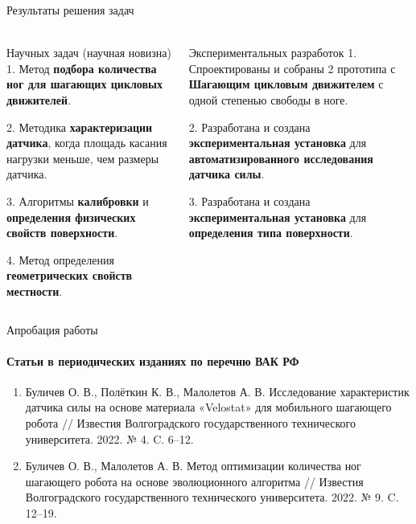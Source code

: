 \documentclass[aspectratio=169,xcolor=table]{beamer}
\begin{document}
\begin{frame}[t]{Результаты решения задач}
    \framesubtitle{}
    \vspace{-0.7cm}
    \begin{columns}[T,onlytextwidth]
        \begin{column}{0.48\textwidth}
            \begin{block}{Научных задач (научная новизна)}
                1. Метод \textbf{подбора количества ног для шагающих цикловых движителей}.

                2. Методика \textbf{характеризации датчика}, когда площадь касания нагрузки меньше, чем размеры датчика.

                3. Алгоритмы \textbf{калибровки} и \textbf{определения физических свойств поверхности}.

                4. Метод определения \textbf{геометрических свойств местности}.

            \end{block}
        \end{column}
        \begin{column}{0.48\textwidth}
            \begin{alertblock}{Экспериментальных разработок}
                1. Спроектированы и собраны 2 прототипа с \textbf{Шагающим цикловым движителем} с одной степенью свободы в ноге.

                2. Разработана и создана \textbf{экспериментальная установка} для \textbf{автоматизированного исследования датчика силы}.

                3. Разработана и создана \textbf{экспериментальная установка} для \textbf{определения типа поверхности}.

            \end{alertblock}
        \end{column}
    \end{columns}
\end{frame}

\begin{frame}[t]{Апробация работы}
    \framesubtitle{Статьи в периодических изданиях по перечню ВАК РФ}
    \begin{enumerate}
        \item Буличев О. В., Полёткин К. В., Малолетов А. В. Исследование характеристик датчика силы на основе материала «Velostat» для мобильного шагающего робота // Известия Волгоградского государственного технического университета. 2022. № 4. C. 6–12.
        \item Буличев О. В., Малолетов А. В. Метод оптимизации количества ног шагающего робота на основе эволюционного алгоритма // Известия Волгоградского государственного технического университета. 2022. № 9. C. 12–19.
    \end{enumerate}
\end{frame}
\end{document}
